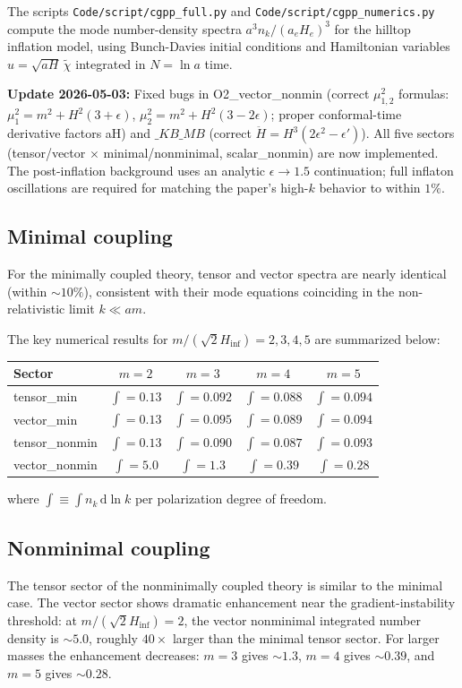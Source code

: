 \documentclass[11pt]{article}
\begin{document}
The scripts \texttt{Code/script/cgpp\_full.py} and \texttt{Code/script/cgpp\_numerics.py} compute the mode number-density spectra $a^3 n_k / (a_e H_e)^3$ for the hilltop inflation model, using Bunch-Davies initial conditions and Hamiltonian variables $u = \sqrt{aH}\,\tilde{\chi}$ integrated in $N = \ln a$ time.

\textbf{Update 2026-05-03:} Fixed bugs in O2\_vector\_nonmin (correct $\mu_{1,2}^2$ formulas: $\mu_1^2=m^2+H^2(3+\epsilon)$, $\mu_2^2=m^2+H^2(3-2\epsilon)$; proper conformal-time derivative factors aH) and $\_KB\_MB$ (correct $\ddot H = H^3(2\epsilon^2-\epsilon')$). All five sectors (tensor/vector $\times$ minimal/nonminimal, scalar\_nonmin) are now implemented. The post-inflation background uses an analytic $\epsilon\to1.5$ continuation; full inflaton oscillations are required for matching the paper's high-$k$ behavior to within $1\%$.

\subsection{Minimal coupling}
For the minimally coupled theory, tensor and vector spectra are nearly identical (within $\sim10\%$), consistent with their mode equations coinciding in the non-relativistic limit $k \ll am$.

The key numerical results for $m/(\sqrt{2}H_\mathrm{inf}) = 2,3,4,5$ are summarized below:

\medskip\noindent
\begin{tabular}{l|cccc}
Sector & $m=2$ & $m=3$ & $m=4$ & $m=5$ \\
\hline
tensor\_min & $\int=0.13$ & $\int=0.092$ & $\int=0.088$ & $\int=0.094$ \\
vector\_min & $\int=0.13$ & $\int=0.095$ & $\int=0.089$ & $\int=0.094$ \\
tensor\_nonmin & $\int=0.13$ & $\int=0.090$ & $\int=0.087$ & $\int=0.093$ \\
vector\_nonmin & $\int=5.0$ & $\int=1.3$ & $\int=0.39$ & $\int=0.28$ \\
\end{tabular}

where $\int \equiv \int n_k \, \mathrm{d}\ln k$ per polarization degree of freedom.

\subsection{Nonminimal coupling}
The tensor sector of the nonminimally coupled theory is similar to the minimal case. The vector sector shows dramatic enhancement near the gradient-instability threshold: at $m/(\sqrt{2}H_\mathrm{inf}) = 2$, the vector nonminimal integrated number density is $\sim5.0$, roughly $40\times$ larger than the minimal tensor sector. For larger masses the enhancement decreases: $m=3$ gives $\sim1.3$, $m=4$ gives $\sim0.39$, and $m=5$ gives $\sim0.28$.
\end{document}
